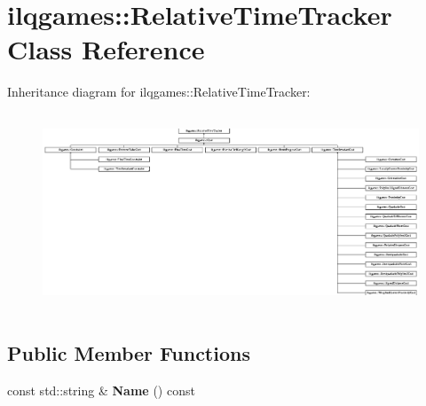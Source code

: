 \hypertarget{classilqgames_1_1_relative_time_tracker}{}\section{ilqgames\+:\+:Relative\+Time\+Tracker Class Reference}
\label{classilqgames_1_1_relative_time_tracker}
Inheritance diagram for ilqgames\+:\+:Relative\+Time\+Tracker\+:\begin{figure}[H]
\begin{center}
\leavevmode
\includegraphics[height=5.877551cm]{classilqgames_1_1_relative_time_tracker}
\end{center}
\end{figure}
\subsection*{Public Member Functions}
\begin{DoxyCompactItemize}
\item 
const std\+::string \& {\bfseries Name} () const \hypertarget{classilqgames_1_1_relative_time_tracker_a9d6d063f0a0940ee647965aaf8ade2b5}{}\label{classilqgames_1_1_relative_time_tracker_a9d6d063f0a0940ee647965aaf8ade2b5}

\end{DoxyCompactItemize}
